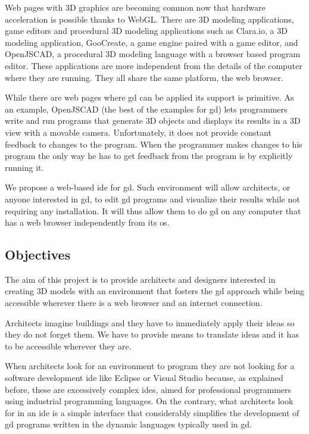 \documentclass{./llncs2e/llncs}
\begin{document}
	Web pages with 3D graphics are becoming common now that hardware acceleration is possible thanks to WebGL\cite{marrin2011webgl}.
	There are 3D modeling applications, game editors and procedural 3D modeling applications such as Clara.io\cite{houston2013clara}, a 3D modeling application, GooCreate\cite{goocreate2015site}, a game engine paired with a game editor, and OpenJSCAD\cite{openjscad2015site}, a procedural 3D modeling language with a browser based program editor.
	These applications are more independent from the details of the computer where they are running.
	They all share the same platform, the web browser.

	While there are web pages where \ac{gd} can be applied its support is primitive.
	As an example, OpenJSCAD (the best of the examples for \ac{gd}) lets programmers write and run programs that generate 3D objects and displays its results in a 3D view with a movable camera.
	Unfortunately, it does not provide constant feedback to changes to the program.
	When the programmer makes changes to his program the only way he has to get feedback from the program is by explicitly running it.

	We propose a web-based \ac{ide} for \ac{gd}. 
	Such environment will allow architects, or anyone interested in \ac{gd}, to edit \ac{gd} programs and visualize their results while not requiring any installation. 
	It will thus allow them to do \ac{gd} on any computer that has a web browser independently from its \ac{os}.
	
	
\subsection{Objectives}
	The aim of this project is to provide architects and designers interested in creating 3D models with an environment that fosters the \acl{gd} approach while being accessible wherever there is a web browser and an internet connection.

	Architects imagine buildings and they have to immediately apply their ideas so they do not forget them.
	We have to provide means to translate ideas and it has to be accessible wherever they are.

	When architects look for an environment to program they are not looking for a software development \ac{ide} like Eclipse or Visual Studio because, as explained before, these are excessively complex \acp{ide}, aimed for professional programmers using industrial programming languages.
	On the contrary, what architects look for in an \ac{ide} is a simple interface that considerably simplifies the development of \ac{gd} programs written in the dynamic languages typically used in \ac{gd}. 
\end{document}
